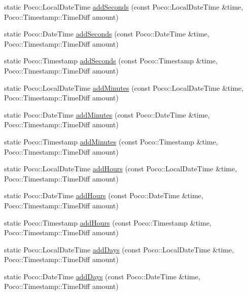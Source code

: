\begin{DoxyCompactItemize}
\item 
static Poco\-::\-Local\-Date\-Time \hyperlink{classofx_1_1_time_1_1_utils_ab4b4f749bc46f83a49775d800e3b259e}{add\-Seconds} (const Poco\-::\-Local\-Date\-Time \&time, Poco\-::\-Timestamp\-::\-Time\-Diff amount)
\item 
static Poco\-::\-Date\-Time \hyperlink{classofx_1_1_time_1_1_utils_a0c81c35f4d7e222608c532c8928e7ad1}{add\-Seconds} (const Poco\-::\-Date\-Time \&time, Poco\-::\-Timestamp\-::\-Time\-Diff amount)
\item 
static Poco\-::\-Timestamp \hyperlink{classofx_1_1_time_1_1_utils_a636103746891f05134bf42285f74f4dc}{add\-Seconds} (const Poco\-::\-Timestamp \&time, Poco\-::\-Timestamp\-::\-Time\-Diff amount)
\item 
static Poco\-::\-Local\-Date\-Time \hyperlink{classofx_1_1_time_1_1_utils_ac5d0aae917881add18dc72c11f149819}{add\-Minutes} (const Poco\-::\-Local\-Date\-Time \&time, Poco\-::\-Timestamp\-::\-Time\-Diff amount)
\item 
static Poco\-::\-Date\-Time \hyperlink{classofx_1_1_time_1_1_utils_a43e5387cdfda3a2bd6c1b62253e8c377}{add\-Minutes} (const Poco\-::\-Date\-Time \&time, Poco\-::\-Timestamp\-::\-Time\-Diff amount)
\item 
static Poco\-::\-Timestamp \hyperlink{classofx_1_1_time_1_1_utils_a0b8651b154d7c4d732b613483ce00c69}{add\-Minutes} (const Poco\-::\-Timestamp \&time, Poco\-::\-Timestamp\-::\-Time\-Diff amount)
\item 
static Poco\-::\-Local\-Date\-Time \hyperlink{classofx_1_1_time_1_1_utils_ac3835661b0039cd3e7533b11a97d5a86}{add\-Hours} (const Poco\-::\-Local\-Date\-Time \&time, Poco\-::\-Timestamp\-::\-Time\-Diff amount)
\item 
static Poco\-::\-Date\-Time \hyperlink{classofx_1_1_time_1_1_utils_a40643c203093f6ca4d8ef46a6fac5606}{add\-Hours} (const Poco\-::\-Date\-Time \&time, Poco\-::\-Timestamp\-::\-Time\-Diff amount)
\item 
static Poco\-::\-Timestamp \hyperlink{classofx_1_1_time_1_1_utils_a8589788e12fc419a8c9a72a1b84c0c67}{add\-Hours} (const Poco\-::\-Timestamp \&time, Poco\-::\-Timestamp\-::\-Time\-Diff amount)
\item 
static Poco\-::\-Local\-Date\-Time \hyperlink{classofx_1_1_time_1_1_utils_a528f095e1d5f6034ce4ef002d75319b3}{add\-Days} (const Poco\-::\-Local\-Date\-Time \&time, Poco\-::\-Timestamp\-::\-Time\-Diff amount)
\item 
static Poco\-::\-Date\-Time \hyperlink{classofx_1_1_time_1_1_utils_ab58d2bde2402e0687028aa78100f2b25}{add\-Days} (const Poco\-::\-Date\-Time \&time, Poco\-::\-Timestamp\-::\-Time\-Diff amount)

\end{DoxyCompactItemize}
